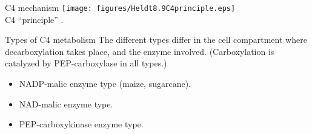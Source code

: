 \documentclass[10pt]{beamer}
\begin{document}
\begin{frame}{C4 mechanism}
    \centering
    \texttt{[image: figures/Heldt8.9C4principle.eps]}\\
    {\small C4 ``principle'' \autocite[from][]{Heldt1997}.}
\end{frame}

\begin{frame}{Types of C4 metabolism}
    The different types differ in the cell compartment where
    decarboxylation takes place, and the enzyme involved.
    (Carboxylation is catalyzed by PEP-carboxylase in all types.)
    \begin{itemize}
        \item NADP-malic enzyme type (maize, sugarcane).
        \item NAD-malic enzyme type.
        \item PEP-carboxykinase enzyme type.
    \end{itemize}
\end{frame}

%
%
%
\end{document}
